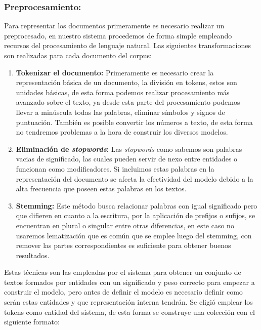\documentclass[runningheads,a4paper]{llncs}
\begin{document}
\subsubsection{Preprocesamiento:} 

Para representar los documentos primeramente es necesario realizar un preprocesado, en nuestro sistema procedemos de forma simple empleando recursos del procesamiento de lenguaje natural. Las siguientes transformaciones son realizadas para cada documento del corpus:

\begin{enumerate}
	\item \textbf{Tokenizar el documento:} Primeramente es necesario crear la representación básica de un documento, la división en tokens, estos son unidades básicas, de esta forma podemos realizar procesamiento más avanzado sobre el texto, ya desde esta parte del procesamiento podemos llevar a minúscula todas las palabras, eliminar símbolos y signos de puntuación. También es posible convertir los números a texto, de esta forma no tendremos problemas a la hora de construir los diversos modelos. \\
	\item \textbf{Eliminación de \textit{stopwords}:} Las \textit{stopwords} como sabemos son palabras vacias de significado, las cuales pueden servir de nexo entre entidades o funcionan como modificadores. Si incluimos estas palabras en la representación del documento se afecta la efectividad del modelo debido a la alta frecuencia que poseen estas palabras en los textos. \\
	\item \textbf{Stemming:} Este método busca relacionar palabras con igual significado
	pero que difieren en cuanto a la escritura, por la aplicación de prefijos o
	sufijos, se encuentran en plural o singular entre otras diferencias, en este caso no usaremos lematización que es común que se emplee luego del stemming, con remover las partes correspondientes es suficiente para obtener buenos resultados.
\end{enumerate} 

Estas técnicas son las empleadas por el sistema para obtener un conjunto de textos formados por entidades con un significado y peso correcto para empezar a construir el modelo, pero antes de definir el modelo es necesario definir como serán estas entidades y que representación interna tendrán. Se eligió emplear los tokens como entidad del sistema, de esta forma se construye una colección con el siguiente formato:  \\
\end{document}
